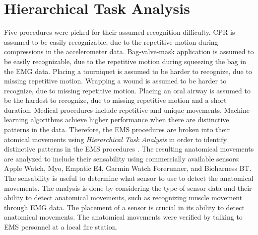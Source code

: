 \section{Hierarchical Task Analysis}
\label{sec:Approach:Hierarchical-Task-Analysis}
 Five procedures were picked for their assumed recognition difficulty. CPR is assumed to be easily recognizable, due to the repetitive motion during compressions in the accelerometer data. Bag-valve-mask application is assumed to be easily recognizable, due to the repetitive motion during squeezing the bag in the EMG data. Placing a tourniquet is assumed to be harder to recognize, due to missing repetitive motion. Wrapping a wound is assumed to be harder to recognize, due to missing repetitive motion. Placing an oral airway is assumed to be the hardest to recognize, due to missing repetitive motion and a short duration. Medical procedures include repetitive and unique movements. Machine-learning algorithms achieve higher performance when there are distinctive patterns in the data. Therefore, the EMS procedures are broken into their atomical movements using \emph{Hierarchical Task Analysis} in order to identify distinctive patterns in the EMS procedures \cite{kirwan1992guide}. The resulting anatomical movements are analyzed to include their sensability using commercially available sensors: Apple Watch, Myo, Empatic E4, Garmin Watch Forerunner, and Bioharness BT. The sensability is useful to determine what sensor to use to detect the anatomical movements. The analysis is done by considering the type of sensor data and their ability to detect anatomical movements, such as recognizing muscle movement through EMG data. The placement of a sensor is crucial in its ability to detect anatomical movements. The anatomical movements were verified by talking to EMS personnel at a local fire station.
